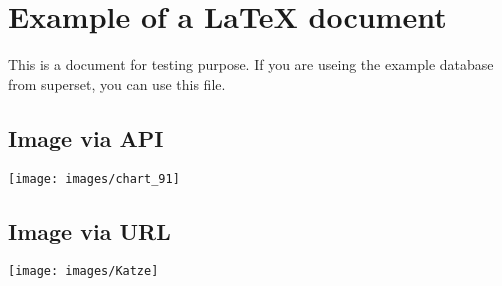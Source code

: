 \documentclass[12pt,paper=a4,ngerman]{scrartcl}
\begin{document}
\section*{Example of a LaTeX document}
This is a document for testing purpose. If you are useing the example database from superset, you can use this file.
\subsection*{Image via API}
\texttt{[image: images/chart\_91]}

\subsection*{Image via URL}
\texttt{[image: images/Katze]}
\end{document}
